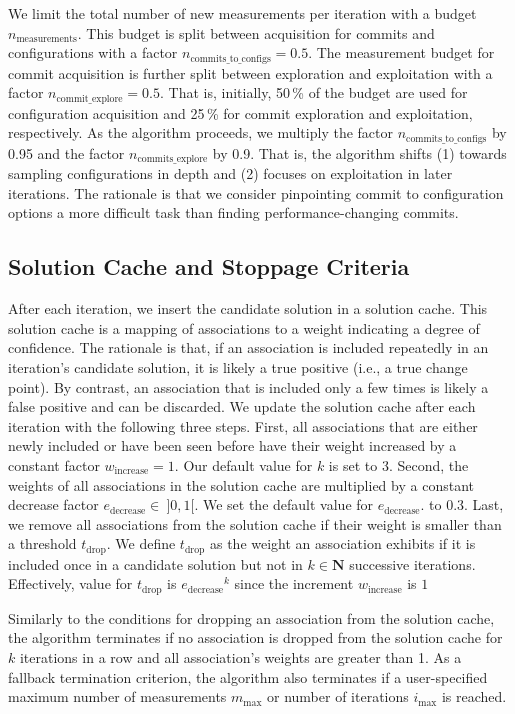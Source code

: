 \documentclass[sigconf]{acmart}
\begin{document}
 	We limit the total number of new measurements per iteration with a budget $n_\text{measurements}$. This budget is split between acquisition for commits and configurations with a factor $n_\text{commits\_to\_configs} = 0.5$. The measurement budget for commit acquisition is further split between exploration and exploitation with a factor $n_\text{commit\_explore} = 0.5$. That is, initially, 50\,\% of the budget are used for configuration acquisition and 25\,\% for commit exploration and exploitation, respectively. As the algorithm proceeds, we multiply the factor $n_\text{commits\_to\_configs}$ by 0.95 and the factor $n_\text{commits\_explore}$ by 0.9. That is, the algorithm shifts  (1) towards sampling configurations in depth and (2) focuses on exploitation in later iterations. The rationale is that we consider pinpointing commit to configuration options a more difficult task than finding performance-changing commits.
 	
	\subsection{Solution Cache and Stoppage Criteria}\label{sec:solutioncache}
	After each iteration, we insert the candidate solution in a solution cache. This solution cache is a mapping of associations to a weight indicating a degree of confidence. 
	The rationale is that, if an association is included repeatedly in an iteration's candidate solution, it is likely a true positive (i.e., a true change point). 
	By contrast, an association that is included only a few times is likely a false positive and can be discarded. 
	We update the solution cache after each iteration with the following three steps. 
	First, all associations that are either newly included or have been seen before have their weight increased by a constant factor $w_\text{increase} = 1$. Our default value for $k$ is set to 3.
	Second, the weights of all associations in the solution cache are multiplied by a constant decrease factor $e_\text{decrease}\in~\rbrack 0,1 \lbrack$. We set the default value for $e_\text{decrease}$. to 0.3.
	Last, we remove all associations from the solution cache if their weight is smaller than a threshold $t_\text{drop}$. We define $t_\text{drop}$ as the weight an association exhibits if it is included once in a candidate solution but not in $k \in \mathbf{N}$ successive iterations. Effectively, value for $t_\text{drop}$ is ${e_\text{decrease}}^k$ since the increment $w_\text{increase}$ is $1$
	
	Similarly to the conditions for dropping an association from the solution cache, the algorithm terminates if no association is dropped from the solution cache for $k$ iterations in a row and all association's weights are greater than 1. As a fallback termination criterion, the algorithm also terminates if a user-specified maximum number of measurements $m_\text{max}$ or number of iterations $i_\text{max}$ is reached. 
	
\end{document}
